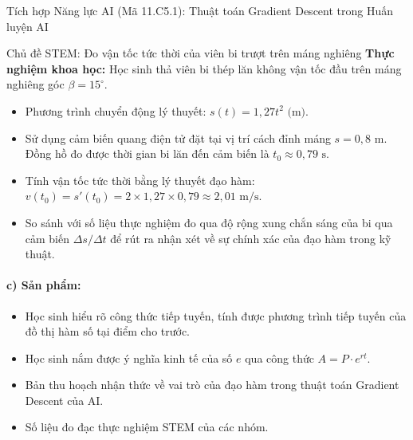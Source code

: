 \documentclass[12pt, a4paper]{article}
\begin{document}
\begin{aibox}{Tích hợp Năng lực AI (Mã 11.C5.1): Thuật toán Gradient Descent trong Huấn luyện AI}
\begin{center}
\end{center}
\end{aibox}

\begin{stembox}{Chủ đề STEM: Đo vận tốc tức thời của viên bi trượt trên máng nghiêng}
\textbf{Thực nghiệm khoa học:} Học sinh thả viên bi thép lăn không vận tốc đầu trên máng nghiêng góc $\beta = 15^\circ$.
\begin{itemize}[leftmargin=0.5cm]
    \item Phương trình chuyển động lý thuyết: $s(t) = 1{,}27 t^2\text{ (m)}$.
    \item Sử dụng cảm biến quang điện tử đặt tại vị trí cách đỉnh máng $s = 0{,}8\text{ m}$. Đồng hồ đo được thời gian bi lăn đến cảm biến là $t_0 \approx 0{,}79\text{ s}$.
    \item Tính vận tốc tức thời bằng lý thuyết đạo hàm: $v(t_0) = s'(t_0) = 2 \times 1{,}27 \times 0{,}79 \approx 2{,}01\text{ m/s}$.
    \item So sánh với số liệu thực nghiệm đo qua độ rộng xung chắn sáng của bi qua cảm biến $\Delta s / \Delta t$ để rút ra nhận xét về sự chính xác của đạo hàm trong kỹ thuật.
\end{itemize}
\end{stembox}

\paragraph{c) Sản phẩm:}
\begin{itemize}[leftmargin=0.8cm]
    \item Học sinh hiểu rõ công thức tiếp tuyến, tính được phương trình tiếp tuyến của đồ thị hàm số tại điểm cho trước.
    \item Học sinh nắm được ý nghĩa kinh tế của số $e$ qua công thức $A = P \cdot e^{rt}$.
    \item Bản thu hoạch nhận thức về vai trò của đạo hàm trong thuật toán Gradient Descent của AI.
    \item Số liệu đo đạc thực nghiệm STEM của các nhóm.
\end{itemize}
\end{document}
